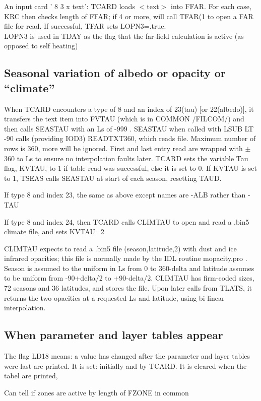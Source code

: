 \documentclass{article}
\begin{document}
An input card ' 8 3 x text': TCARD loads $<$text$>$ into FFAR. 
For each case, KRC then checks length of FFAR; if 4 or more, will call TFAR(1 
to open a FAR file for read. If successful, TFAR sets LOPN3=.true. 
\\ LOPN3 is used in TDAY as the flag that the far-field calculation is active
(as opposed to self heating)

\subsection{ Seasonal variation of albedo or opacity or ``climate''}%

When TCARD encounters a type of 8 and an index of 23(tau) [or 22(albedo)], it
transfers the text item into FVTAU (which is in COMMON /FILCOM/) and then calls
SEASTAU with an Ls of -999 .  SEASTAU when called with LSUB LT -90 calls
(providing IOD3) READTXT360, which reads file. Maximum number of rows is 360,
more will be ignored. First and last entry read are wrapped with $\pm$360 to Ls
to ensure no interpolation faults later. TCARD sets the variable Tau flag, KVTAU,
to 1 if table-read was successful, else it is set to 0.
If KVTAU is set to 1, TSEAS calls SEASTAU at start of each season, resetting TAUD. 

If type 8 and index 23, the same as above except names are -ALB rather than -TAU

If type 8 and index 24, then TCARD calls CLIMTAU to open and read a .bin5 
climate file, and sets KVTAU=2

CLIMTAU expects to read a .bin5 file (season,latitude,2) with dust and ice
infrared opacities; this file is normally made by the IDL routine mopacity.pro .
Season is assumed to the uniform in Ls from 0 to 360-delta and latitude assumes
to be uniform from -90+delta/2 to +90-delta/2. CLIMTAU has firm-coded sizes, 72
seasons and 36 latitudes, and stores the file. Upon later calls from TLATS, it
returns the two opacities at a requested Ls and latitude, using bi-linear
interpolation.

\subsection{ When parameter and layer tables appear} %
The flag LD18 means: a value has changed after the parameter and layer tables
were last are printed. It is set: initially and by TCARD. It is cleared when the
tabel are printed,

 Can tell if zones are active by length of FZONE in common
\end{document}
